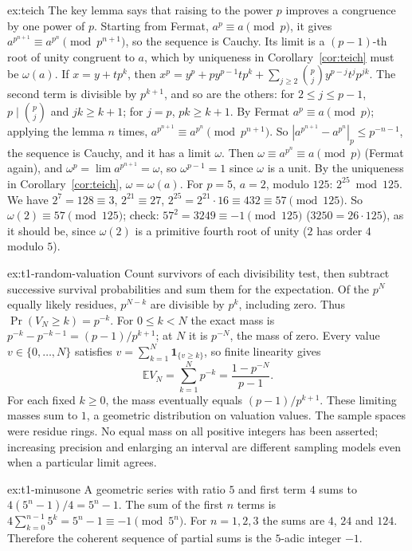 \begin{solution}{ex:teich}
\idea The key lemma says that raising to the power $p$ improves a congruence by one power of $p$. Starting from Fermat, $a^p\equiv a\pmod p$, it gives $a^{p^{n+1}}\equiv a^{p^n}\pmod{p^{n+1}}$, so the sequence is Cauchy. Its limit is a $(p-1)$-th root of unity congruent to $a$, which by uniqueness in Corollary~\ref{cor:teich} must be $\omega(a)$.
\writeup If $x=y+tp^k$, then $x^p=y^p+py^{p-1}tp^k+\sum_{j\ge2}\binom pjy^{p-j}t^jp^{jk}$. The second term is divisible by $p^{k+1}$, and so are the others: for $2\le j\le p-1$, $p\mid\binom pj$ and $jk\ge k+1$; for $j=p$, $pk\ge k+1$. By Fermat $a^p\equiv a\pmod p$; applying the lemma $n$ times, $a^{p^{n+1}}\equiv a^{p^n}\pmod{p^{n+1}}$. So $|a^{p^{n+1}}-a^{p^n}|_p\le p^{-n-1}$, the sequence is Cauchy, and it has a limit $\omega$. Then $\omega\equiv a^{p^n}\equiv a\pmod p$ (Fermat again), and $\omega^p=\lim a^{p^{n+1}}=\omega$, so $\omega^{p-1}=1$ since $\omega$ is a unit. By the uniqueness in Corollary~\ref{cor:teich}, $\omega=\omega(a)$. For $p=5$, $a=2$, modulo $125$: $2^{25}\bmod125$. We have $2^7=128\equiv3$, $2^{21}\equiv27$, $2^{25}=2^{21}\cdot16\equiv432\equiv57\pmod{125}$. So $\omega(2)\equiv57\pmod{125}$; check: $57^2=3249\equiv-1\pmod{125}$ ($3250=26\cdot125$), as it should be, since $\omega(2)$ is a primitive fourth root of unity ($2$ has order $4$ modulo $5$).
\end{solution}

\begin{solution}{ex:t1-random-valuation}
\idea Count survivors of each divisibility test, then subtract successive
survival probabilities and sum them for the expectation.
\writeup Of the $p^N$ equally likely residues, $p^{N-k}$ are divisible
by $p^k$, including zero. Thus $\operatorname{Pr}(V_N\ge k)=p^{-k}$.
For $0\le k<N$ the exact mass is
$p^{-k}-p^{-k-1}=(p-1)/p^{k+1}$; at $N$ it is $p^{-N}$,
the mass of zero.
Every value $v\in\{0,\dots,N\}$ satisfies
$v=\sum_{k=1}^N\mathbf1_{\{v\ge k\}}$, so finite linearity gives
\[
\mathbb E V_N=\sum_{k=1}^Np^{-k}=\frac{1-p^{-N}}{p-1}.
\]
For each fixed $k\ge0$, the mass eventually equals $(p-1)/p^{k+1}$.
These limiting masses sum to $1$, a geometric distribution on valuation values.
The sample spaces were residue rings. No equal mass on all positive integers
has been asserted; increasing precision and enlarging an interval are
different sampling models even when a particular limit agrees.
\end{solution}

\begin{solution}{ex:t1-minusone}
\idea A geometric series with ratio $5$ and first term $4$ sums to $4(5^n-1)/4=5^n-1$.
\writeup The sum of the first $n$ terms is $4\sum_{k=0}^{n-1}5^k=5^n-1\equiv -1\pmod{5^n}$. For $n=1,2,3$ the sums are $4$, $24$ and $124$. Therefore the coherent sequence of partial sums is the $5$-adic integer $-1$.
\end{solution}

